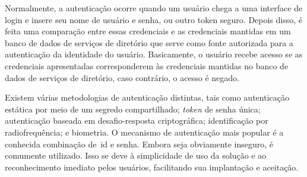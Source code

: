 Normalmente, a autenticação ocorre quando um usuário chega a uma interface de
login e insere seu nome de usuário e senha, ou outro token seguro.
Depois disso, é feita uma comparação entre essas credenciais e as credenciais
mantidas em um banco de dados de serviços de diretório que serve como fonte
autorizada para a autenticação da identidade do usuário.
Basicamente, o usuário recebe acesso se as credenciais apresentadas
corresponderem às credenciais mantidas no banco de dados de serviços de diretório,
caso contrário, o acesso é negado\cite[p.112]{alnaji2020}.

Existem várias metodologias de autenticação distintas,
tais como autenticação estática por meio de um segredo compartilhado;
\textit{token} de senha única; autenticação baseada em desafio-resposta criptográfica;
identificação por radiofrequência; e biometria.
O mecanismo de autenticação mais popular é a conhecida combinação de~\acrfull{id} e senha.
Embora seja obviamente inseguro, é comumente utilizado.
Isso se deve à simplicidade de uso da solução e ao reconhecimento imediato pelos
usuários, facilitando sua implantação e aceitação\cite{idrus2013}.




